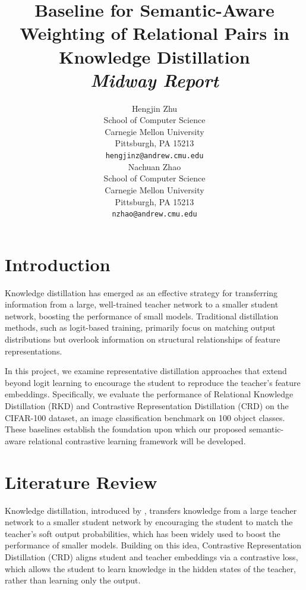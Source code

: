 \documentclass{article}
\title{Baseline for Semantic-Aware Weighting of Relational Pairs in Knowledge Distillation\\
{\small \textit{Midway Report}}}
\author{
  Hengjin Zhu\\
  School of Computer Science\\
  Carnegie Mellon University\\
  Pittsburgh, PA 15213 \\
  \texttt{hengjinz@andrew.cmu.edu} \\
  \And
  Nachuan Zhao\\
  School of Computer Science\\
  Carnegie Mellon University\\
  Pittsburgh, PA 15213 \\
  \texttt{nzhao@andrew.cmu.edu} \\
}
\begin{document}
\maketitle



\section{Introduction}
Knowledge distillation has emerged as an effective strategy for transferring information from a large, well-trained teacher network to a smaller student network, boosting the performance of small models. Traditional distillation methods, such as logit-based training, primarily focus on matching output distributions but  overlook information on structural relationships of feature representations. 

In this project, we examine representative distillation approaches that extend beyond logit learning to encourage the student to reproduce the teacher’s feature embeddings. Specifically, we evaluate the performance of Relational Knowledge Distillation (RKD) and Contrastive Representation Distillation (CRD) on the CIFAR-100 dataset, an image classification benchmark on 100 object classes. These baselines establish the foundation upon which our proposed semantic-aware relational contrastive learning framework will be developed.


\section{Literature Review}
Knowledge distillation, introduced by \citet{hinton2015distilling}, transfers knowledge from a large teacher network to a smaller student network by encouraging the student to match the teacher’s soft output probabilities, which has been widely used to boost the performance of smaller models. Building on this idea, Contrastive Representation Distillation (CRD) \citep{crd_tian2022contrastiverepresentationdistillation} aligns student and teacher embeddings via a contrastive loss, which allows the student to learn knowledge in the hidden states of the teacher, rather than learning only the output.  
\end{document}
